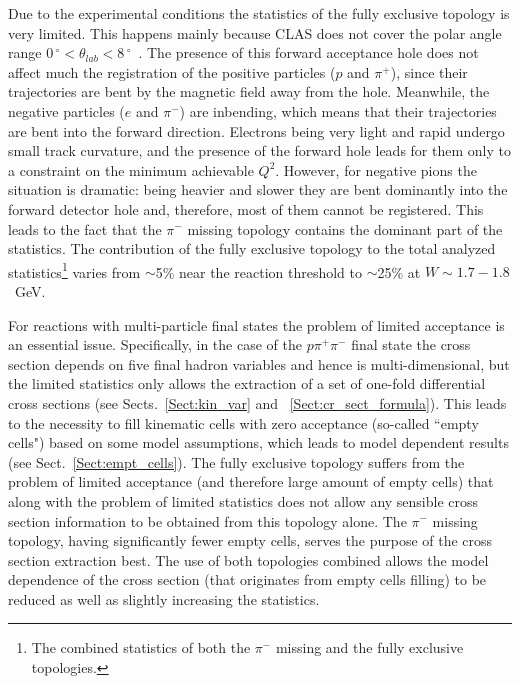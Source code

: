 Due to the experimental conditions the statistics of the fully exclusive topology is very limited. This happens mainly because CLAS does not cover the polar angle range $0\,^{\circ}\mathrm{} < \theta_{lab} < 8\,^{\circ}\mathrm{}$~\cite{Mecking:2003zu}. The presence of this forward acceptance
hole does not affect much the registration of the positive particles ($p$ and $\pi^{+}$), since their trajectories are bent by the magnetic field away from the hole. Meanwhile, the negative particles ($e$ and $\pi^{-}$) are inbending, which means that their trajectories are bent into the forward direction. Electrons being very light and rapid undergo small track curvature, and the presence of the forward hole leads for them only to a constraint on the minimum achievable $Q^2$. However, for negative pions the situation is dramatic: being heavier and slower they are bent dominantly into the forward detector hole and, therefore, most of them cannot be registered. This leads to the fact that the $\pi^{-}$ missing topology contains the dominant part of the statistics. The contribution of the fully exclusive topology to the total analyzed statistics\footnote[8]{The combined statistics of both the $\pi^{-}$ missing and the fully exclusive topologies.} varies from $\sim$5\% near the reaction threshold to $\sim$25\% at $W\sim 1.7-1.8$~GeV. 
 
For reactions with multi-particle final states the problem of limited acceptance is an essential issue. Specifically, in the case of the $p\pi^{+}\pi^{-}$ final state the cross section  depends on five final hadron variables and hence is multi-dimensional, but the limited statistics only allows the extraction of a set of one-fold differential cross sections (see Sects.~\ref{Sect:kin_var} and ~\ref{Sect:cr_sect_formula}). This leads to the necessity to fill kinematic cells with zero acceptance (so-called ``empty cells") based on some model assumptions, which leads to model dependent results (see Sect.~\ref{Sect:empt_cells}). The fully exclusive topology suffers from the problem of limited acceptance (and therefore large amount of empty cells) that along with the problem of limited statistics does not allow any sensible cross section information to be obtained from this topology alone. The $\pi^{-}$ missing topology, having significantly fewer empty cells, serves the purpose of the cross section extraction best. The use of both topologies combined allows the model dependence of the cross section (that originates from empty cells filling) to be reduced as well as slightly increasing the statistics.

